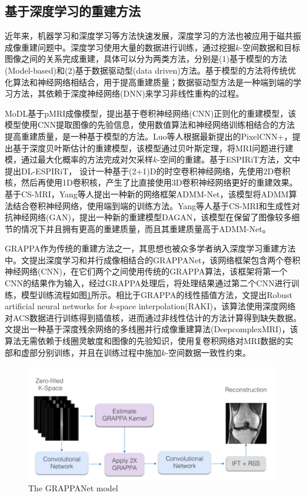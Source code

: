 \documentclass[UTF8]{article}
\begin{document}
\subsection{基于深度学习的重建方法}
\par 近年来，机器学习和深度学习等方法快速发展，深度学习的方法也被应用于磁共振成像重建问题中。深度学习使用大量的数据进行训练，通过挖掘$k$-空间数据和目标图像之间的关系完成重建，具体可以分为两类方法，分别是(1)基于模型的方法(Model-based)和(2)基于数据驱动型(data driven)方法。基于模型的方法将传统优化算法和神经网络相结合，用于提高重建质量；数据驱动型方法是一种端到端的学习方法，其依赖于深度神经网络(DNN)来学习非线性重构的过程。

\par MoDL\cite{aggarwal2018modl}基于pMRI成像模型，提出基于卷积神经网络(CNN)正则化的重建模型，该模型使用CNN提取图像的先验信息，使用数值算法和神经网络训练相结合的方法提高重建质量，是一种基于模型的方法。Luo等人根据最新提出的PixelCNN+\cite{salimans2017pixelcnn++}，提出基于深度贝叶斯估计的重建模型\cite{luo2020mri}，该模型通过贝叶斯定理，将MRI问题进行建模，通过最大化概率的方法完成对欠采样$k$-空间的重建。基于ESPIRiT方法，文\cite{sandino2021accelerating}中提出DL-ESPIRiT， 设计一种基于(2+1)D的时空卷积神经网络，先使用2D卷积核，然后再使用1D卷积核，产生了比直接使用3D卷积神经网络更好的重建效果。基于CS-MRI，Yang等人提出一种新的网络框架ADMM-Net\cite{yang2016deep}，该模型将ADMM算法结合卷积神经网络，使用端到端的训练方法。Yang等人基于CS-MRI和生成性对抗神经网络(GAN)，提出一种新的重建模型DAGAN\cite{yang2017dagan}，该模型在保留了图像较多细节的情况下并且拥有更高的重建质量，而且其重建质量高于ADMM-Net。
\par GRAPPA作为传统的重建方法之一，其思想也被众多学者纳入深度学习重建方法中。文\cite{9157643}提出深度学习和并行成像相结合的GRAPPANet，该网络框架包含两个卷积神经网络(CNN)，在它们两个之间使用传统的GRAPPA算法，该框架将第一个CNN的结果作为输入，经过GRAPPA处理后，将处理结果通过第二个CNN进行训练，模型训练流程如图\ref{GRAPPANet}所示。相比于GRAPPA的线性插值方法，文\cite{Mehmet2019Scan}提出Robust artificial neural networks for $k$-space interpolation(RAKI)，该算法使用深度网络对ACS数据进行训练得到插值核，进而通过非线性估计的方法计算得到缺失数据。文\cite{WANG2020136}提出一种基于深度残余网络的多线圈并行成像重建算法(DeepcomplexMRI)，该算法无需依赖于线圈灵敏度和图像的先验知识，使用复卷积网络对MRI数据的实部和虚部分别训练，并且在训练过程中施加$k$-空间数据一致性约束。
\begin{figure}[ht]
	\centering
	\includegraphics[scale=1]{./image/GRAPPANet.png}
	\caption{The GRAPPANet model}
	\label{GRAPPANet}
\end{figure}
\end{document}
